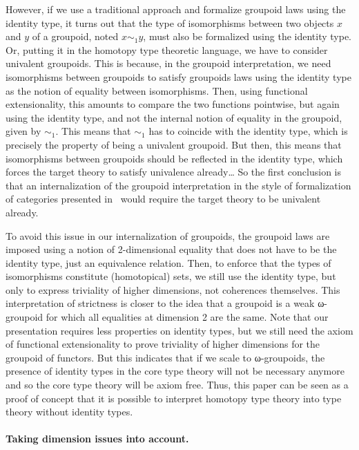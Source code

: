 However, if we use a traditional approach and formalize groupoid laws
using the identity type, it turns out that the type of isomorphisms
between two objects $x$ and $y$ of a groupoid, noted $x \sim_1 y$, must
also be formalized using the identity type. Or, putting it in the
homotopy type theoretic language, we have to consider univalent
groupoids.
%
This is because, in the groupoid interpretation, we need isomorphisms
between groupoids to satisfy groupoids laws using the identity
type as the notion of equality between isomorphisms. Then, using
functional extensionality, this amounts to compare the two functions
pointwise, but again using the identity type, and not the internal
notion of equality in the groupoid, given by $\sim_1$.
%
This means that $\sim_1$ has to coincide with the identity type, which
is precisely the property of being a univalent groupoid.
%
But then, this means that isomorphisms between groupoids should be
reflected in the identity type, which forces the target theory to
satisfy univalence already\ldots
%
So the first conclusion is that an internalization of the groupoid
interpretation in the style of formalization of categories presented
in~\cite{hottbook} would require the target theory to be univalent already.
 
To avoid this issue in our internalization of groupoids, the groupoid
laws are imposed using a notion of 2-dimensional equality that does
not have to be the identity type, just an equivalence relation.
%
Then, to enforce that the types of isomorphisms constitute
(homotopical) sets, we still use the identity type, but only to
express triviality of higher dimensions, not coherences themselves.
%
This interpretation of strictness is closer to the idea that a
groupoid is a weak ω-groupoid for which all equalities at dimension 2
are the same.
%
%
Note that our presentation requires less properties on identity types,
but we still need the axiom of functional extensionality to prove
triviality of higher dimensions for the groupoid of functors.
%
But this indicates that if we scale to ω-groupoids, the presence of
identity types in the core type theory will not be necessary anymore
and so the core type theory will be axiom free.
%
Thus, this paper can be seen as a proof of concept that it is possible
to interpret homotopy type theory into type theory without identity
types.


\paragraph{\bf Taking dimension issues into account.}
%

